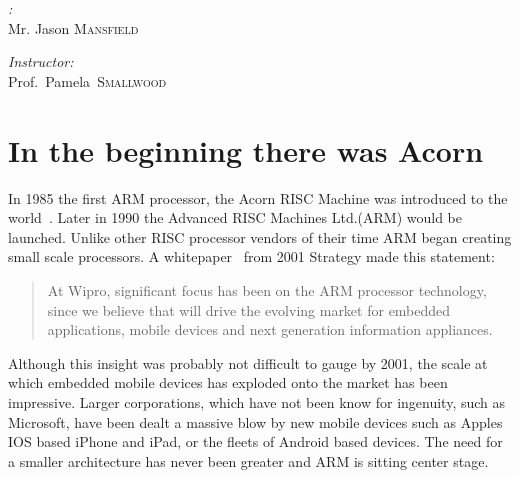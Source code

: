 \documentclass[11pt]{report}
\begin{document}
\lstset{language=[mips]Assembler}
\begin{titlepage}

\begin{center}
\textsc{{\LARGE\color{Sepia}{CS440}}}\\[1.5cm]
\textsc{{\LARGE\color{Bittersweet}{ARM11}}}\\[1.5cm]

\begin{minipage}{0.4\textwidth}
\begin{flushleft} \large
\emph{\color{RedOrange}{Author}:}\\
Mr. Jason \textsc{Mansfield}
\end{flushleft}\end{minipage}
\begin{minipage}{0.4\textwidth}
\begin{flushright} \large
\emph{\color{RedOrange}Instructor:} \\
Prof.~Pamela~\textsc{Smallwood}
\end{flushright}
\end{minipage}
\end{center}
\end{titlepage}

\tableofcontents
\clearpage
\section{In the beginning there was Acorn}
\begin{doublespace}
In 1985 the first ARM processor, the Acorn RISC Machine was introduced to the world~\citep{levy2005history}. Later in 1990 the Advanced RISC Machines Ltd.(ARM) would be launched. Unlike other RISC processor vendors of their time ARM began creating small scale processors. A whitepaper~\citep{kamath2001system} from 2001 Strategy made this statement: 
\end{doublespace}
\begin{quote}
At Wipro, significant focus has been on the ARM processor technology, since we believe that will drive the evolving market for embedded applications, mobile devices and next generation information appliances.
\end{quote}
\begin{doublespace}
Although this insight was probably not difficult to gauge by 2001, the scale at which embedded mobile devices has exploded onto the market has been impressive. Larger corporations, which have not been know for ingenuity, such as Microsoft, have been dealt a massive blow by new mobile devices such as Apples IOS based iPhone and iPad, or the fleets of Android based devices. The need for a smaller architecture has never been greater and ARM is sitting center stage. 
\end{doublespace}
\end{document}
